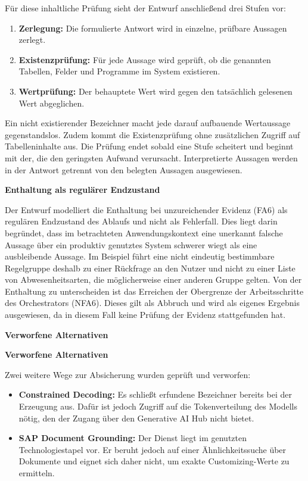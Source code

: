 Für diese inhaltliche Prüfung sieht der Entwurf anschließend drei Stufen vor:
\begin{enumerate}
	\item \textbf{Zerlegung:} Die formulierte Antwort wird in einzelne, prüfbare Aussagen zerlegt.
	\item \textbf{Existenzprüfung:} Für jede Aussage wird geprüft, ob die genannten Tabellen, Felder und Programme im System existieren.
	\item \textbf{Wertprüfung:} Der behauptete Wert wird gegen den tatsächlich gelesenen Wert abgeglichen.
\end{enumerate}
Ein nicht existierender Bezeichner macht jede darauf aufbauende Wertaussage gegenstandslos. Zudem kommt die Existenzprüfung ohne zusätzlichen Zugriff auf Tabelleninhalte aus. Die Prüfung endet sobald eine Stufe scheitert und beginnt mit der, die den geringsten Aufwand verursacht. Interpretierte Aussagen werden in der Antwort getrennt von den belegten Aussagen ausgewiesen.

\textbf{Enthaltung als regulärer Endzustand}

Der Entwurf modelliert die Enthaltung bei unzureichender Evidenz (FA6) als regulären Endzustand des Ablaufs und nicht als Fehlerfall. Dies liegt darin begründet, dass im betrachteten Anwendungskontext eine unerkannt falsche Aussage über ein produktiv genutztes System schwerer wiegt als eine ausbleibende Aussage. Im Beispiel führt eine nicht eindeutig bestimmbare Regelgruppe deshalb zu einer Rückfrage an den Nutzer und nicht zu einer Liste von Abwesenheitsarten, die möglicherweise einer anderen Gruppe gelten. Von der Enthaltung zu unterscheiden ist das Erreichen der Obergrenze der Arbeitsschritte des Orchestrators (NFA6). Dieses gilt als Abbruch und wird als eigenes Ergebnis ausgewiesen, da in diesem Fall keine Prüfung der Evidenz stattgefunden hat.

\textbf{Verworfene Alternativen}

\textbf{Verworfene Alternativen}

Zwei weitere Wege zur Absicherung wurden geprüft und verworfen:
\begin{itemize}
	\item \textbf{Constrained Decoding:} Es schließt erfundene Bezeichner bereits bei der Erzeugung aus. Dafür ist jedoch Zugriff auf die Tokenverteilung des Modells nötig, den der Zugang über den Generative AI Hub nicht bietet. %
	\item \textbf{SAP Document Grounding:} Der Dienst liegt im genutzten Technologiestapel vor. Er beruht jedoch auf einer Ähnlichkeitssuche über Dokumente und eignet sich daher nicht, um exakte Customizing-Werte zu ermitteln. %
\end{itemize}

